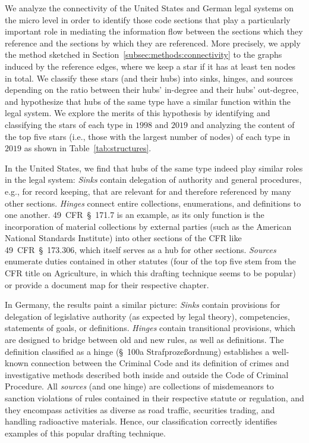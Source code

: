 \documentclass[utf8,sort&compress,table,hidelinks]{frontiersFPHY} %
\begin{document}
We analyze the connectivity of the United States and German legal systems on the micro level in order to identify those code sections that play a particularly important role in mediating the information flow between the sections which they reference and the sections by which they are referenced.
More precisely, we apply the method sketched in Section~\ref{subsec:methods:connectivity} to the graphs induced by the reference edges, where we keep a star if it has at least ten nodes in total. 
We classify these stars (and their hubs) into sinks, hinges, and sources depending on the ratio between their hubs' in-degree and their hubs' out-degree, and hypothesize that hubs of the same type have a similar function within the legal system. 
We explore the merits of this hypothesis by identifying and classifying the stars of each type in $1998$ and $2019$ and analyzing the content of the top five stars (i.e., those with the largest number of nodes) of each type in $2019$ as shown in Table~\ref{tab:structures}.



In the United States, we find that hubs of the same type indeed play similar roles in the legal system: 
\emph{Sinks} contain delegation of authority and general procedures, e.g., for record keeping, that are relevant for and therefore referenced by many other sections.
\emph{Hinges} connect entire collections, enumerations, and definitions to one another. 
49~CFR~§~171.7 is an example, as its only function is the incorporation of material collections by external parties (such as the American National Standards Institute) into other sections of the CFR like 49~CFR~§~173.306, which itself serves as a hub for other sections. 
\emph{Sources} enumerate duties contained in other statutes (four of the top five stem from the CFR title on Agriculture, in which this drafting technique seems to be popular) or provide a document map for their respective chapter. 

In Germany, the results paint a similar picture:
\emph{Sinks} contain provisions for delegation of legislative authority (as expected by legal theory), competencies, statements of goals, or definitions.
\emph{Hinges} contain transitional provisions, 
which are designed to bridge between old and new rules, as well as definitions.
The definition classified as a hinge (§~100a Strafprozeßordnung) establishes a well-known connection between the Criminal Code and its definition of crimes and investigative methods described both inside and outside the Code of Criminal Procedure.
All \emph{sources} (and one hinge) are collections of misdemeanors to sanction violations of rules contained in their respective statute or regulation, 
and they encompass activities as diverse as road traffic, securities trading, and handling radioactive materials.
Hence, our classification correctly identifies examples of this popular drafting technique.
\end{document}
